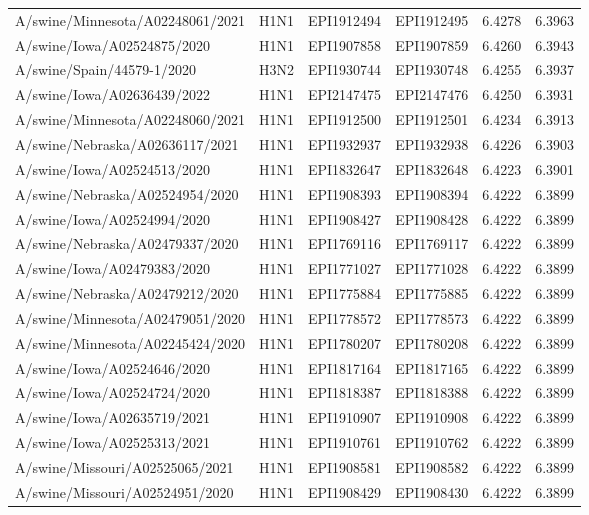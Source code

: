 \begin{tabular}{L{1.95in}|L{.25in}|L{.60in}|L{.6in}|C{1in}|C{1in}}
 A/swine/Minnesota/A02248061/2021 &H1N1&EPI1912494&EPI1912495&6.4278&6.3963\\
 A/swine/Iowa/A02524875/2020 &H1N1&EPI1907858&EPI1907859&6.4260&6.3943\\
 A/swine/Spain/44579-1/2020 &H3N2&EPI1930744&EPI1930748&6.4255&6.3937\\
 A/swine/Iowa/A02636439/2022 &H1N1&EPI2147475&EPI2147476&6.4250&6.3931\\
 A/swine/Minnesota/A02248060/2021 &H1N1&EPI1912500&EPI1912501&6.4234&6.3913\\
 A/swine/Nebraska/A02636117/2021 &H1N1&EPI1932937&EPI1932938&6.4226&6.3903\\
 A/swine/Iowa/A02524513/2020 &H1N1&EPI1832647&EPI1832648&6.4223&6.3901\\
 A/swine/Nebraska/A02524954/2020 &H1N1&EPI1908393&EPI1908394&6.4222&6.3899\\
 A/swine/Iowa/A02524994/2020 &H1N1&EPI1908427&EPI1908428&6.4222&6.3899\\
 A/swine/Nebraska/A02479337/2020 &H1N1&EPI1769116&EPI1769117&6.4222&6.3899\\
 A/swine/Iowa/A02479383/2020 &H1N1&EPI1771027&EPI1771028&6.4222&6.3899\\
 A/swine/Nebraska/A02479212/2020 &H1N1&EPI1775884&EPI1775885&6.4222&6.3899\\
 A/swine/Minnesota/A02479051/2020 &H1N1&EPI1778572&EPI1778573&6.4222&6.3899\\
 A/swine/Minnesota/A02245424/2020 &H1N1&EPI1780207&EPI1780208&6.4222&6.3899\\
 A/swine/Iowa/A02524646/2020 &H1N1&EPI1817164&EPI1817165&6.4222&6.3899\\
 A/swine/Iowa/A02524724/2020 &H1N1&EPI1818387&EPI1818388&6.4222&6.3899\\
 A/swine/Iowa/A02635719/2021 &H1N1&EPI1910907&EPI1910908&6.4222&6.3899\\
 A/swine/Iowa/A02525313/2021 &H1N1&EPI1910761&EPI1910762&6.4222&6.3899\\
 A/swine/Missouri/A02525065/2021 &H1N1&EPI1908581&EPI1908582&6.4222&6.3899\\
 A/swine/Missouri/A02524951/2020 &H1N1&EPI1908429&EPI1908430&6.4222&6.3899\\

\end{tabular}
